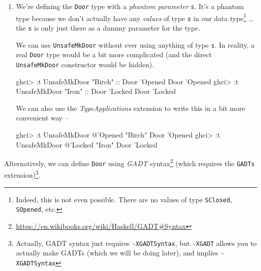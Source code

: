 \documentclass[]{article}
\newenvironment{Shaded}{}{}
\newcommand{\DataTypeTok}[1]{\textcolor[rgb]{0.56,0.13,0.00}{#1}}
\newcommand{\CharTok}[1]{\textcolor[rgb]{0.25,0.44,0.63}{#1}}
\newcommand{\StringTok}[1]{\textcolor[rgb]{0.25,0.44,0.63}{#1}}
\newcommand{\OtherTok}[1]{\textcolor[rgb]{0.00,0.44,0.13}{#1}}
\newcommand{\FunctionTok}[1]{\textcolor[rgb]{0.02,0.16,0.49}{#1}}
\newcommand{\NormalTok}[1]{#1}
\renewcommand{\href}[2]{#2\footnote{\url{#1}}}
\begin{document}
\begin{enumerate}
\def\labelenumi{\arabic{enumi}.}
\setcounter{enumi}{2}
\item
  We're defining the \texttt{Door} type with a \emph{phantom parameter}
  \texttt{s}. It's a phantom type because we don't actually have any
  \emph{values} of type \texttt{s} in our data type\footnote{Indeed, this is not
    even possible. There are no values of type
    \texttt{\textquotesingle{}SClosed}, \texttt{\textquotesingle{}SOpened}, etc.}
  \ldots{}the \texttt{s} is only just there as a dummy parameter for the type.

  We can use \texttt{UnsafeMkDoor} without ever using anything of type
  \texttt{s}. In reality, a real \texttt{Door} type would be a bit more
  complicated (and the direct \texttt{UnsafeMkDoor} constructor would be
  hidden).

\begin{Shaded}
\begin{Highlighting}[]
\NormalTok{ghci}\FunctionTok{>} \FunctionTok{:}\NormalTok{t }\DataTypeTok{UnsafeMkDoor} \StringTok{"Birch"}\OtherTok{ ::} \DataTypeTok{Door} \CharTok{'Opened}
\DataTypeTok{Door} \CharTok{'Opened}
\NormalTok{ghci}\FunctionTok{>} \FunctionTok{:}\NormalTok{t }\DataTypeTok{UnsafeMkDoor} \StringTok{"Iron"}\OtherTok{ ::} \DataTypeTok{Door} \CharTok{'Locked}
\DataTypeTok{Door} \CharTok{'Locked}
\end{Highlighting}
\end{Shaded}

  We can also use the \emph{TypeApplications} extension to write this in a bit
  more convenient way --

\begin{Shaded}
\begin{Highlighting}[]
\NormalTok{ghci}\FunctionTok{>} \FunctionTok{:}\NormalTok{t }\DataTypeTok{UnsafeMkDoor} \FunctionTok{@}\CharTok{'Opened "Birch"}
\DataTypeTok{Door} \CharTok{'Opened}
\NormalTok{ghci}\FunctionTok{>} \FunctionTok{:}\NormalTok{t }\DataTypeTok{UnsafeMkDoor} \FunctionTok{@}\CharTok{'Locked "Iron"}
\DataTypeTok{Door} \CharTok{'Locked}
\end{Highlighting}
\end{Shaded}
\end{enumerate}

Alternatively, we can define \texttt{Door} using
\href{https://en.wikibooks.org/wiki/Haskell/GADT\#Syntax}{\emph{GADT} syntax}
(which requires the \texttt{GADTs} extension)\footnote{Actually, GADT syntax
  just requires \texttt{-XGADTSyntax}, but \texttt{-XGADT} allows you to
  actually make GADTs (which we will be doing later), and implies
  \texttt{-XGADTSyntax}}.
\end{document}

